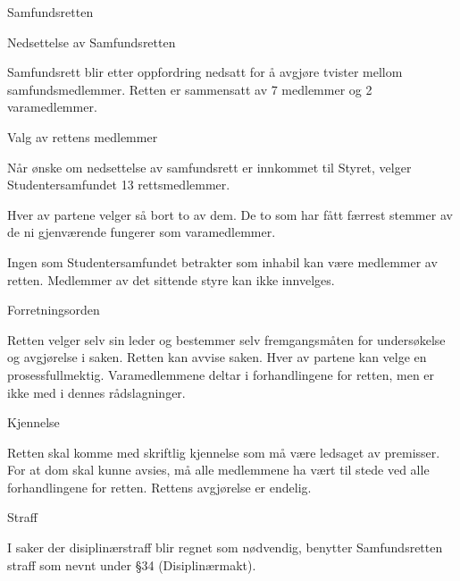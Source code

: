 \begin{lovkapittel}{Samfundsretten}

  \begin{lovparagraf}{Nedsettelse av Samfundsretten}
  
Samfundsrett blir etter oppfordring nedsatt for å avgjøre tvister mellom samfundsmedlemmer. Retten er sammensatt
av 7 medlemmer og 2 varamedlemmer.

  \end{lovparagraf}
  
  \begin{lovparagraf}{Valg av rettens medlemmer}

Når ønske om nedsettelse av samfundsrett er innkommet til Styret, velger Studentersamfundet 13 rettsmedlemmer.

Hver av partene velger så bort to av dem. De to som har fått færrest stemmer av de ni gjenværende fungerer som
varamedlemmer.

Ingen som Studentersamfundet betrakter som inhabil kan være medlemmer av retten. Medlemmer av det sittende styre
kan ikke innvelges.

  \end{lovparagraf}
  
  \begin{lovparagraf}{Forretningsorden}
  
Retten velger selv sin leder og bestemmer selv fremgangsmåten for undersøkelse og avgjørelse i saken. Retten kan
avvise saken. Hver av partene kan velge en prosessfullmektig. Varamedlemmene deltar i forhandlingene for retten,
men er ikke med i dennes rådslagninger.
  
  \end{lovparagraf}
  
  \begin{lovparagraf}{Kjennelse}
  
Retten skal komme med skriftlig kjennelse som må være ledsaget av premisser. For at dom skal kunne avsies, må alle
medlemmene ha vært til stede ved alle forhandlingene for retten. Rettens avgjørelse er endelig.
  
  \end{lovparagraf}
  
  \begin{lovparagraf}{Straff}
  
I saker der disiplinærstraff blir regnet som nødvendig, benytter Samfundsretten straff som nevnt under §34
(Disiplinærmakt).

  \end{lovparagraf}
  
\end{lovkapittel}



